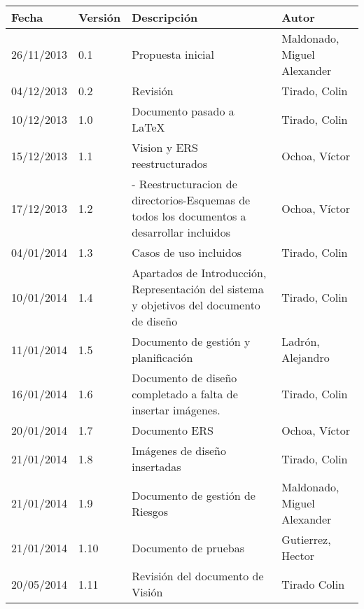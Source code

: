 \begin{tabular}{|p{3cm}|p{1.5cm}|p{3.5cm}|p{4cm}|}
    \hline
    \textbf{Fecha} & \textbf{Versión} & \textbf{Descripción} & \textbf{Autor} \\
    \hline
    26/11/2013 & 0.1 & Propuesta inicial & Maldonado, Miguel Alexander \\
    \hline
    04/12/2013 & 0.2 & Revisión & Tirado, Colin \\
    \hline
    10/12/2013 & 1.0 & Documento pasado a LaTeX & Tirado, Colin \\
    \hline
    15/12/2013 & 1.1 & Vision y ERS reestructurados & Ochoa, Víctor \\
    \hline
    17/12/2013 & 1.2 & - Reestructuracion de directorios\newline -Esquemas de todos los documentos a desarrollar incluidos & Ochoa, Víctor \\
    \hline
    04/01/2014 & 1.3 & Casos de uso incluidos & Tirado, Colin \\
    \hline
    10/01/2014 & 1.4 & Apartados de Introducci\'on, Representaci\'on del sistema y objetivos del documento de dise\~no & Tirado, Colin \\
    \hline
    11/01/2014 & 1.5 & Documento de gestión y planificación & Ladrón, Alejandro \\
    \hline
    16/01/2014 & 1.6 & Documento de dise\~no completado a falta de insertar im\'agenes. & Tirado, Colin \\
    \hline
    20/01/2014 & 1.7 & Documento ERS & Ochoa, Víctor \\
    \hline
    21/01/2014 & 1.8 & Imágenes de diseño insertadas & Tirado, Colin \\
    \hline
    21/01/2014 & 1.9 & Documento de gestión de Riesgos & Maldonado, Miguel Alexander\\
    \hline
    21/01/2014 & 1.10 & Documento de pruebas & Gutierrez, Hector \\
    \hline
    20/05/2014 & 1.11 & Revisión del documento de Visión & Tirado Colin \\
    \hline
\end{tabular}

